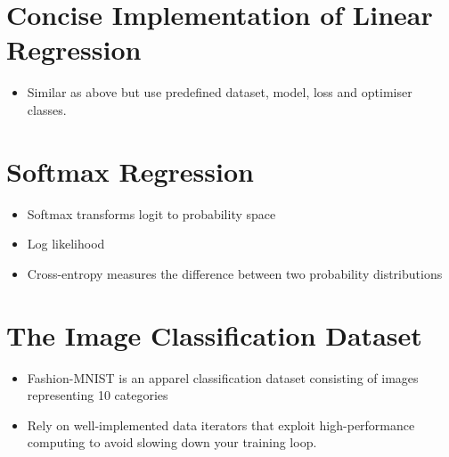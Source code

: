 \documentclass[12pt,notitlepage]{article}
\begin{document}
\section{Concise Implementation of Linear Regression}
\begin{itemize}
    \item Similar as above but use predefined dataset, model, loss and optimiser classes.
\end{itemize}

\section{Softmax Regression}
\begin{itemize}
    \item Softmax transforms logit to probability space
    \item Log likelihood
    \item Cross-entropy measures the difference between two probability distributions
\end{itemize}

\section{The Image Classification Dataset}
\begin{itemize}
    \item Fashion-MNIST is an apparel classification dataset consisting of images representing 10 categories
    \item Rely on well-implemented data iterators that exploit high-performance computing to avoid slowing down your training loop.
\end{itemize}

\vfill

\nocite{zhang2020dive}
\end{document}
